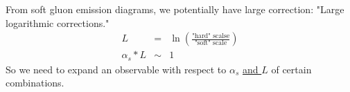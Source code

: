 \documentclass[10pt]{article}
\begin{document}
From soft gluon emission diagrams, we potentially have large correction: "Large logarithmic corrections."
\begin{eqnarray*}
L &=& \ln\left( \frac{\text{"hard" scalse} }{\text{"soft" scale} }\right) \\
\alpha_s * L &\sim& 1
\end{eqnarray*}
So we need to expand an observable with respect to $\alpha_s$ \underline{and $L$} of certain combinations.
\end{document}
